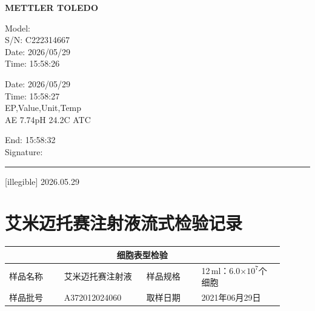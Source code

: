 \documentclass[UTF8,10pt,a4paper,fontset=fandol]{ctexart}
\newcommand{\fieldvalue}[1]{#1}
\newcommand{\handwritten}[1]{#1}
\begin{document}
\begin{minipage}[t]{0.47\linewidth}
\vspace{1.25cm}

\textbf{METTLER TOLEDO}

\noindent
Model: \\
S/N: \fieldvalue{C222314667}\\
Date: \fieldvalue{2026/05/29}\\
Time: \fieldvalue{15:58:26}

\medskip
\noindent
Date: \fieldvalue{2026/05/29}\\
Time: \fieldvalue{15:58:27}\\
EP,Value,Unit,Temp\\
\fieldvalue{AE 7.74pH 24.2\textdegree C ATC}

\medskip
End: \fieldvalue{15:58:32}\\
Signature: \rule{0.72\linewidth}{0.4pt}

\fieldvalue{\handwritten{[illegible] 2026.05.29}}
\end{minipage}

\newpage

\section*{艾米迈托赛注射液流式检验记录}

\begin{tabular}{|p{0.18\linewidth}|p{0.27\linewidth}|p{0.18\linewidth}|p{0.27\linewidth}|}
\hline
\multicolumn{4}{c|}{细胞表型检验} \\
\hline
样品名称 & 艾米迈托赛注射液 & 样品规格 & 12\,ml：6.0$\times 10^7$个细胞 \\
\hline
样品批号 &
\fieldvalue{\handwritten{A372012024060}} &
取样日期 &
\fieldvalue{\handwritten{2021年06月29日}} \\
\hline
\end{tabular}
\end{document}
